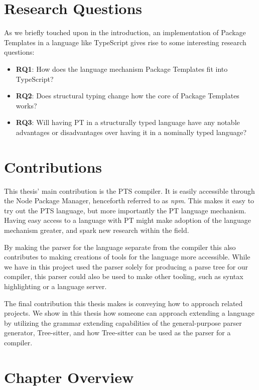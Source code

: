 \section{Research Questions}\label{sec:research-questions}

As we briefly touched upon in the introduction, an implementation of Package Templates in a language like TypeScript gives rise to some interesting research questions:

\begin{itemize}
    \item \textbf{RQ1}: How does the language mechanism Package Templates fit into TypeScript?
    \item \textbf{RQ2}: Does structural typing change how the core of Package Templates works?
    \item \textbf{RQ3}: Will having PT in a structurally typed language have any notable advantages or disadvantages over having it in a nominally typed language?
\end{itemize}

\section{Contributions}\label{sec:contributions}

This thesis' main contribution is the PTS compiler.
It is easily accessible through the Node Package Manager, henceforth referred to as \emph{npm}.
This makes it easy to try out the PTS language, but more importantly the PT language mechanism.
Having easy access to a language with PT might make adoption of the language mechanism greater, and spark new research within the field.

By making the parser for the language separate from the compiler this also contributes to making creations of tools for the language more accessible.
While we have in this project used the parser solely for producing a parse tree for our compiler, this parser could also be used to make other tooling, such as syntax highlighting or a language server.

The final contribution this thesis makes is conveying how to approach related projects.
We show in this thesis how someone can approach extending a language by utilizing the grammar extending capabilities of the general-purpose parser generator, Tree-sitter, and how Tree-sitter can be used as the parser for a compiler.

\section{Chapter Overview}\label{sec:chapter-overview}

